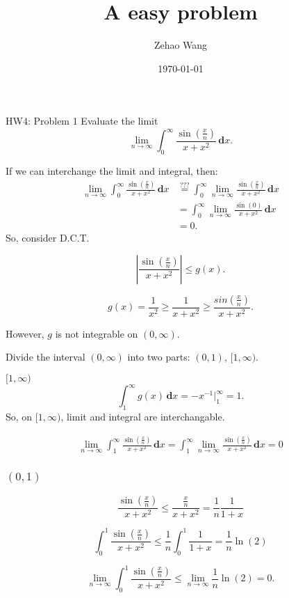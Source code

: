 \documentclass{beamer}
\title{A easy problem}
\date{\today}
\author{Zehao Wang}
\newcommand{\der}{\,\mathbf{d}}
\begin{document}
    \begin{frame}{HW4: Problem 1}
    Evaluate the limit
        \[
            \lim_{n\to \infty}\int_0^\infty\frac{\sin\left(\frac{x}{n}\right)}{x+x^2}\der x. 
        \]
    \end{frame}

    \begin{frame}
        If we can interchange the limit and integral, then: 
        \[
            \begin{aligned}
                \lim_{n\to \infty}\int_0^\infty\frac{\sin\left(\frac{x}{n}\right)}{x+x^2}\der x
                &\overset{???}{=} \int_0^\infty\lim_{n\to \infty}\frac{\sin\left(\frac{x}{n}\right)}{x+x^2}\der x \\
                &=\int_0^\infty\lim_{n\to \infty}\frac{\sin\left(0\right)}{x+x^2}\der x \\
                &=0. 
            \end{aligned}
        \]
        So, consider D.C.T. 
    \end{frame}

    \begin{frame}
        \[
            \left|\frac{\sin\left(\frac{x}{n}\right)}{x+x^2}\right|\leqslant g(x). 
        \]

        \[
            g(x)=\frac{1}{x^2}\geqslant\frac{1}{x+x^2}\geqslant\frac{sin\left(\frac{x}{n}\right)}{x+x^2}. 
        \]

        However, $g$ is not integrable on $(0,\infty)$. 

        Divide the interval $(0,\infty)$ into two parts: $(0,1)$, $[1,\infty)$. 
    \end{frame}

    \begin{frame}{$[1,\infty)$}
        \[
            \int_1^\infty g(x)\der x=-x^{-1}\big|_1^\infty=1. 
        \]
        So, on $[1,\infty)$, limit and integral are interchangable. 

        \[
            \begin{aligned}
            \lim_{n\to \infty}\int_1^\infty\frac{\sin\left(\frac{x}{n}\right)}{x+x^2}\der x
            =\int_1^\infty\lim_{n\to \infty}\frac{\sin\left(\frac{x}{n}\right)}{x+x^2}\der x =0
            \end{aligned}
        \] 
    \end{frame}

    \begin{frame}
        \frametitle{$(0,1)$}
        \[
            \frac{\sin\left(\frac{x}{n}\right)}{x+x^2}\leqslant\frac{\frac{x}{n}}{x+x^2}=\frac{1}{n}\frac{1}{1+x}
        \]

        \[
            \int_0^1\frac{\sin\left(\frac{x}{n}\right)}{x+x^2}\leqslant\frac{1}{n}\int_0^1\frac{1}{1+x}=\frac{1}{n}\ln(2)
        \]

        \[
            \lim_{n\to\infty}\int_0^1\frac{\sin\left(\frac{x}{n}\right)}{x+x^2}\leqslant\lim_{n\to\infty}\frac{1}{n}\ln(2)=0. 
        \]
    \end{frame}
\end{document}
